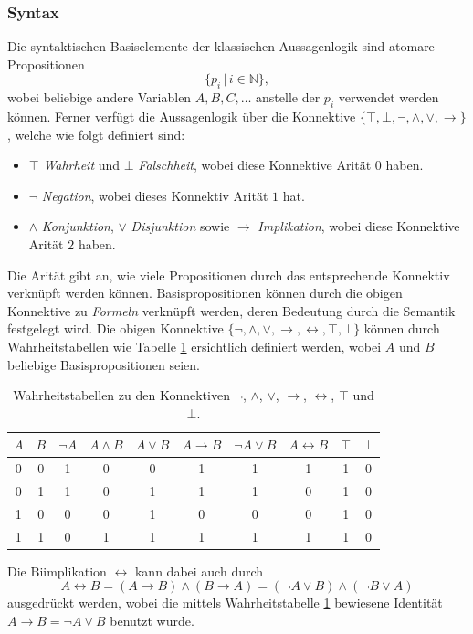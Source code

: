 \documentclass[a4paper,11pt]{article}
\numberwithin{equation}{section}
\begin{document}
\subsubsection{Syntax}
Die syntaktischen Basiselemente der klassischen Aussagenlogik sind atomare Propositionen $$
\{p_i\, | \,i \in \mathbb{N}\},$$  wobei beliebige andere Variablen $A, B, C, \dots$ anstelle der $p_i$ verwendet werden können. Ferner verfügt die Aussagenlogik über die Konnektive $\{\top, \bot, \neg, \land, \lor, \rightarrow\}$, welche wie folgt definiert sind:
\begin{itemize}
\item $\top$ \textit{Wahrheit} und $\bot$ \textit{Falschheit}, wobei diese Konnektive Arität $0$ haben.
\item $\neg$ \textit{Negation}, wobei dieses Konnektiv Arität $1$ hat.
\item $\land$ \textit{Konjunktion}, $\lor$ \textit{Disjunktion} sowie $\rightarrow$ \textit{Implikation}, wobei diese Konnektive Arität $2$ haben.
\end{itemize} Die Arität gibt an, wie viele Propositionen durch das entsprechende Konnektiv verknüpft werden können. Basispropositionen können durch die obigen Konnektive zu \textit{Formeln} verknüpft werden, deren Bedeutung durch die Semantik festgelegt wird. Die obigen Konnektive $\{\neg, \land, \lor, \rightarrow, \leftrightarrow, \top, \bot\}$ können durch Wahrheitstabellen wie Tabelle \ref{W_Konnektive} ersichtlich definiert werden, wobei $A$ und $B$ beliebige Basispropositionen seien.

\begin{table}
\centering
\footnotesize
\begin{tabular}{|c|c|c|c|c|c|c|c|c|c|}
\hline
$A$ & $B$ & $\neg A$ & $A \land B$ & $A \lor B$ & $A \rightarrow B$ & $\neg A \lor B$ & $A \leftrightarrow B$ & $\top$ & $\bot$ \\
\hline\hline
0 & 0 & 1 & 0 & 0 & 1 & 1 & 1 & 1 & 0 \\
\hline
0 & 1 & 1 & 0 & 1 & 1 & 1 & 0 & 1 & 0 \\
\hline
1 & 0 & 0 & 0 & 1 & 0 & 0 & 0 & 1 & 0 \\
\hline
1 & 1 & 0 & 1 & 1 & 1 & 1 & 1 & 1 & 0 \\
\hline
\end{tabular}
\caption{Wahrheitstabellen zu den Konnektiven $\neg$, $\land$, $\lor$, $\rightarrow$, $\leftrightarrow$, $\top$ und $\bot$.}
\label{W_Konnektive}
\normalsize
\end{table}
Die Biimplikation $\leftrightarrow$ kann dabei auch durch $$ A \leftrightarrow B = (A \rightarrow B) \land (B \rightarrow A) = (\neg A \lor B) \land (\neg B \lor A)$$ ausgedrückt werden, wobei die mittels Wahrheitstabelle \ref{W_Konnektive} bewiesene Identität $A \rightarrow B = \neg A \lor B$ benutzt wurde.
\end{document}
